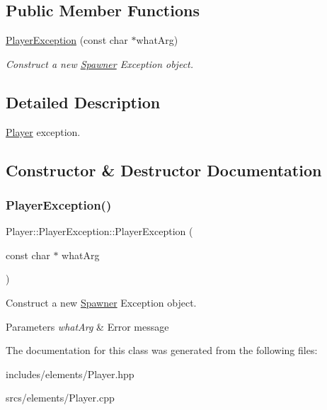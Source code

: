 \subsection*{Public Member Functions}
\begin{DoxyCompactItemize}
\item 
\hyperlink{class_player_1_1_player_exception_a219d068157ccf7f4ff6eab4b46c86aba}{Player\+Exception} (const char $\ast$what\+Arg)
\begin{DoxyCompactList}\small\item\em Construct a new \hyperlink{class_spawner}{Spawner} Exception object. \end{DoxyCompactList}\end{DoxyCompactItemize}


\subsection{Detailed Description}
\hyperlink{class_player}{Player} exception. 

\subsection{Constructor \& Destructor Documentation}
\mbox{\label{class_player_1_1_player_exception_a219d068157ccf7f4ff6eab4b46c86aba}} 
\subsubsection{\texorpdfstring{Player\+Exception()}{PlayerException()}}
{\footnotesize\ttfamily Player\+::\+Player\+Exception\+::\+Player\+Exception (\begin{DoxyParamCaption}\item[{const char $\ast$}]{what\+Arg }\end{DoxyParamCaption})\hspace{0.3cm}{\ttfamily [explicit]}}



Construct a new \hyperlink{class_spawner}{Spawner} Exception object. 


\begin{DoxyParams}{Parameters}
{\em what\+Arg} & Error message \\
\hline
\end{DoxyParams}


The documentation for this class was generated from the following files\+:\begin{DoxyCompactItemize}
\item 
includes/elements/Player.\+hpp\item 
srcs/elements/Player.\+cpp\end{DoxyCompactItemize}
